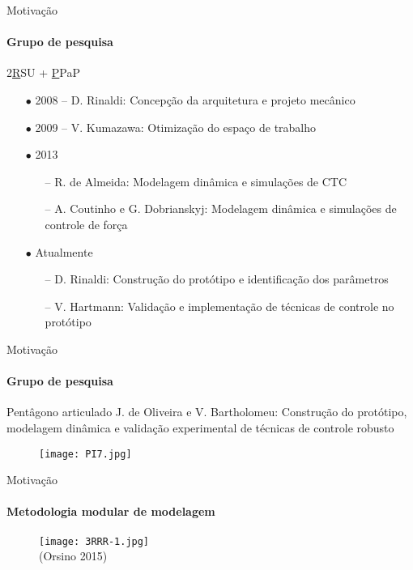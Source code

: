 \documentclass[25pt,landscape]{beamer}
\begin{document}
\begin{frame}{Motiva\c{c}\~ao}
	\framesubtitle{Grupo de pesquisa}
	\begin{block}{2\underline{R}SU + \underline{P}PaP}
		\begin{itemize}
			\item[$\bullet$] 2008 -- D. Rinaldi: Concep\c{c}\~ao da arquitetura e projeto mec\^anico \\[4pt]
			\item[$\bullet$] 2009 -- V. Kumazawa: Otimiza\c{c}\~ao do espa\c{c}o de trabalho \\[4pt]
			\item[$\bullet$] 2013
			\begin{itemize}
				\item[--] R. de Almeida: Modelagem din\^amica e simula\c{c}\~oes de CTC \\[4pt]
				\item[--] A. Coutinho e G. Dobrianskyj: Modelagem din\^amica e simula\c{c}\~oes de controle de for\c{c}{a} \\[4pt]
			\end{itemize}
			\item[$\bullet$] Atualmente
			\begin{itemize}
				\item[--] D. Rinaldi: Constru\c{c}\~ao  do prot\'otipo e identifica\c{c}\~ao dos par\^ametros \\[4pt]
				\item[--] V. Hartmann: Valida\c{c}\~ao e implementa\c{c}\~ao de t\'ecnicas de controle no protótipo \\[4pt]
			\end{itemize}
		\end{itemize}
	\end{block}
\end{frame}

\begin{frame}{Motiva\c{c}\~ao}
	\framesubtitle{Grupo de pesquisa}
	\begin{block}{Pent\^agono articulado}
		J. de Oliveira e V. Bartholomeu: Constru\c{c}\~ao do prot\'otipo, modelagem din\^amica e valida\c{c}\~ao experimental de t\'ecnicas de controle robusto
	\end{block}
    \begin{figure}[!h]
        \centering
        \texttt{[image: PI7.jpg]}
    \end{figure}
\end{frame}

\begin{frame}{Motiva\c{c}\~ao}
    \framesubtitle{Metodologia modular de modelagem}
    \pause
    \begin{figure}[!h]
        \centering
        \texttt{[image: 3RRR-1.jpg]} \\
        (Orsino 2015)
    \end{figure}  
\end{frame}
\end{document}
